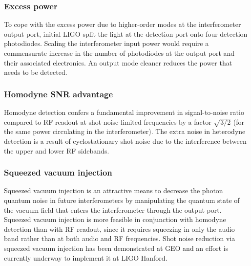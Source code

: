\subsubsection*{Excess power}
To cope with the excess power due to higher-order modes at the
interferometer output port, initial LIGO split the light at the
detection port onto four detection photodiodes.  Scaling the
interferometer input power would require a commensurate increase in
the number of photodiodes at the output port and their associated
electronics.  An output mode cleaner reduces the power that needs to
be detected.

\subsubsection*{Homodyne SNR advantage} 
Homodyne detection confers a fundamental improvement in
signal-to-noise ratio compared to RF readout at shot-noise-limited
frequencies by a factor $\sqrt{3/2}$ (for the same power circulating
in the interferometer).  The extra noise in heterodyne detection is a
result of cyclostationary shot noise\cite{Niebauer1991Nonstationary}
due to the interference between the upper and lower RF sidebands.

\subsubsection*{Squeezed vacuum injection} 
Squeezed vacuum injection is an attractive means to decrease the
photon quantum noise in future interferometers by manipulating the
quantum state of the vacuum field that enters the interferometer
through the output port.  Squeezed vacuum injection is more feasible
in conjunction with homodyne detection than with RF readout, since it
requires squeezing in only the audio band rather than at both audio
and RF frequencies\cite{GeaBanacloche1987Squeezed,
  Chelkowski2007Coherent}.  Shot noise reduction via squeezed vacuum
injection has been demonstrated at GEO\cite{GeoSqueezingNature2011}
and an effort is currently underway to implement it at LIGO
Hanford\cite{H1SqueezerProposal}.

